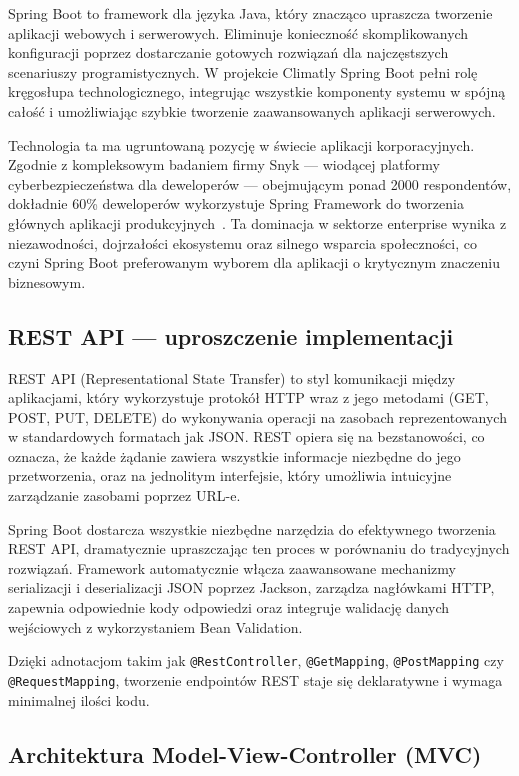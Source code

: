 \documentclass[a4paper,12pt,openany]{book}
\begin{document}
Spring Boot to framework dla języka Java, który znacząco upraszcza tworzenie aplikacji webowych i serwerowych. Eliminuje konieczność skomplikowanych konfiguracji poprzez dostarczanie gotowych rozwiązań dla najczęstszych scenariuszy programistycznych. W projekcie Climatly Spring Boot pełni rolę kręgosłupa technologicznego, integrując wszystkie komponenty systemu w spójną całość i umożliwiając szybkie tworzenie zaawansowanych aplikacji serwerowych.

Technologia ta ma ugruntowaną pozycję w świecie aplikacji korporacyjnych. Zgodnie z kompleksowym badaniem firmy Snyk — wiodącej platformy cyberbezpieczeństwa dla deweloperów — obejmującym ponad 2000 respondentów, dokładnie 60\% deweloperów wykorzystuje Spring Framework do tworzenia głównych aplikacji produkcyjnych~\cite{bib:snyk2020}. Ta dominacja w sektorze enterprise wynika z niezawodności, dojrzałości ekosystemu oraz silnego wsparcia społeczności, co czyni Spring Boot preferowanym wyborem dla aplikacji o krytycznym znaczeniu biznesowym.

\subsection*{REST API --- uproszczenie implementacji}

REST API (Representational State Transfer) to styl komunikacji między aplikacjami, który wykorzystuje protokół HTTP wraz z jego metodami (GET, POST, PUT, DELETE) do wykonywania operacji na zasobach reprezentowanych w standardowych formatach jak JSON. REST opiera się na bezstanowości, co oznacza, że każde żądanie zawiera wszystkie informacje niezbędne do jego przetworzenia, oraz na jednolitym interfejsie, który umożliwia intuicyjne zarządzanie zasobami poprzez URL-e.

Spring Boot dostarcza wszystkie niezbędne narzędzia do efektywnego tworzenia REST API, dramatycznie upraszczając ten proces w porównaniu do tradycyjnych rozwiązań. Framework automatycznie włącza zaawansowane mechanizmy serializacji i deserializacji JSON poprzez Jackson, zarządza nagłówkami HTTP, zapewnia odpowiednie kody odpowiedzi oraz integruje walidację danych wejściowych z wykorzystaniem Bean Validation.

Dzięki adnotacjom takim jak \texttt{@RestController}, \texttt{@GetMapping}, \texttt{@PostMapping} czy \texttt{@RequestMapping}, tworzenie endpointów REST staje się deklaratywne i wymaga minimalnej ilości kodu.

\subsection*{Architektura Model-View-Controller (MVC)}
\end{document}
